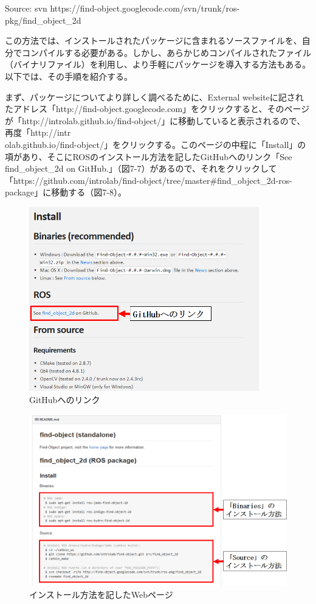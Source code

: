 Source: svn https://find-object.googlecode.com/svn/trunk/ros-pkg/find\_object\_2d

この方法では、インストールされたパッケージに含まれるソースファイルを、自分でコンパイルする必要がある。しかし、あらかじめコンパイルされたファイル（バイナリファイル）を利用し、より手軽にパッケージを導入する方法もある。以下では、その手順を紹介する。

まず、パッケージについてより詳しく調べるために、External websiteに記されたアドレス「http://find-object.googlecode.com」をクリックすると、そのページが「http://introlab.github.io/find-object/」に移動していると表示されるので、再度「http://intr\\olab.github.io/find-object/」をクリックする。このページの中程に「Install」の項があり、そこにROSのインストール方法を記したGitHubへのリンク「See find\_object\_2d on GitHub.」（図7-7）があるので、それをクリックして「https://github.com/introlab/find-object/tree/master#find\_object\_2d-ros-package」に移動する（図7-8）。

\begin{figure}[htp]
  \centering
  \includegraphics[width=10cm]{pictures/chapter7/pic_07_07.png}
  \caption{GitHubへのリンク}
\end{figure}

\begin{figure}[htp]
  \centering
  \includegraphics[width=15cm]{pictures/chapter7/pic_07_08.png}
  \caption{インストール方法を記したWebページ}
\end{figure}

